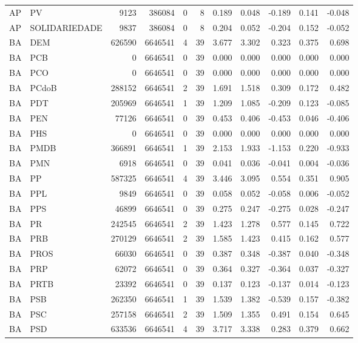 \begin{landscape}
\begin{longtable}{llrrrrrrrrr}
AP & PV & 9123 & 386084 & 0 & 8 & 0.189 & 0.048 & -0.189 & 0.141 & -0.048 \\
AP & SOLIDARIEDADE & 9837 & 386084 & 0 & 8 & 0.204 & 0.052 & -0.204 & 0.152 & -0.052 \\
BA & DEM & 626590 & 6646541 & 4 & 39 & 3.677 & 3.302 & 0.323 & 0.375 & 0.698 \\
BA & PCB & 0 & 6646541 & 0 & 39 & 0.000 & 0.000 & 0.000 & 0.000 & 0.000 \\
BA & PCO & 0 & 6646541 & 0 & 39 & 0.000 & 0.000 & 0.000 & 0.000 & 0.000 \\
BA & PCdoB & 288152 & 6646541 & 2 & 39 & 1.691 & 1.518 & 0.309 & 0.172 & 0.482 \\
BA & PDT & 205969 & 6646541 & 1 & 39 & 1.209 & 1.085 & -0.209 & 0.123 & -0.085 \\
BA & PEN & 77126 & 6646541 & 0 & 39 & 0.453 & 0.406 & -0.453 & 0.046 & -0.406 \\
BA & PHS & 0 & 6646541 & 0 & 39 & 0.000 & 0.000 & 0.000 & 0.000 & 0.000 \\
BA & PMDB & 366891 & 6646541 & 1 & 39 & 2.153 & 1.933 & -1.153 & 0.220 & -0.933 \\
BA & PMN & 6918 & 6646541 & 0 & 39 & 0.041 & 0.036 & -0.041 & 0.004 & -0.036 \\
BA & PP & 587325 & 6646541 & 4 & 39 & 3.446 & 3.095 & 0.554 & 0.351 & 0.905 \\
BA & PPL & 9849 & 6646541 & 0 & 39 & 0.058 & 0.052 & -0.058 & 0.006 & -0.052 \\
BA & PPS & 46899 & 6646541 & 0 & 39 & 0.275 & 0.247 & -0.275 & 0.028 & -0.247 \\
BA & PR & 242545 & 6646541 & 2 & 39 & 1.423 & 1.278 & 0.577 & 0.145 & 0.722 \\
BA & PRB & 270129 & 6646541 & 2 & 39 & 1.585 & 1.423 & 0.415 & 0.162 & 0.577 \\
BA & PROS & 66030 & 6646541 & 0 & 39 & 0.387 & 0.348 & -0.387 & 0.040 & -0.348 \\
BA & PRP & 62072 & 6646541 & 0 & 39 & 0.364 & 0.327 & -0.364 & 0.037 & -0.327 \\
BA & PRTB & 23392 & 6646541 & 0 & 39 & 0.137 & 0.123 & -0.137 & 0.014 & -0.123 \\
BA & PSB & 262350 & 6646541 & 1 & 39 & 1.539 & 1.382 & -0.539 & 0.157 & -0.382 \\
BA & PSC & 257158 & 6646541 & 2 & 39 & 1.509 & 1.355 & 0.491 & 0.154 & 0.645 \\
BA & PSD & 633536 & 6646541 & 4 & 39 & 3.717 & 3.338 & 0.283 & 0.379 & 0.662 \\

\end{longtable}
\end{landscape}
